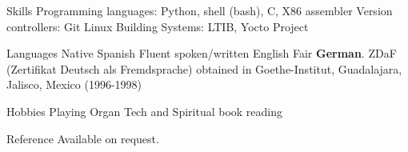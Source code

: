 \documentclass{resume}
\begin{document}
\begin{category}{Skills}
\citembullet Programming languages: Python, shell (bash), C, X86 assembler
\citembullet Version controllers: Git
\citembullet Linux Building Systems: LTIB, Yocto Project
\end{category}

\begin{category}{Languages}
\citembullet Native Spanish
\citembullet Fluent spoken/written English
\citembullet Fair \textbf{German}. ZDaF (Zertifikat Deutsch als Fremdsprache) obtained in Goethe-Institut, Guadalajara, Jalisco, Mexico (1996-1998)
\end{category}

\begin{category}{Hobbies}
\citembullet Playing Organ
\citembullet Tech and Spiritual book reading
\end{category}

\begin{category}{Reference} 
\citemnobullet Available on request.
\end{category}
\end{document}
